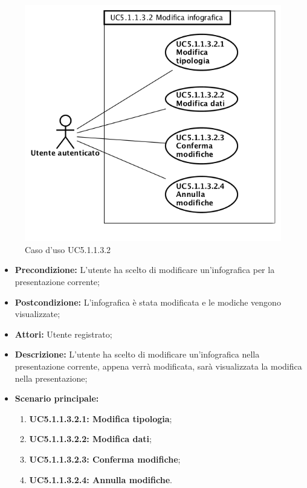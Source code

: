 \begin{figure}[h]
	\begin{center}
	\includegraphics[scale=0.4]{diagram/UC5-1-1-3-2.png}
	\caption{Caso d'uso UC5.1.1.3.2}
	\end{center}
\end{figure}
\begin{itemize}
	\item \textbf{Precondizione:} L'utente ha scelto di modificare un'infografica per la presentazione corrente;
	\item \textbf{Postcondizione:} L'infografica è stata modificata e le modiche vengono visualizzate;
	\item \textbf{Attori:} Utente registrato;
	\item \textbf{Descrizione:} L'utente ha scelto di modificare un'infografica nella presentazione corrente, appena verrà modificata, sarà visualizzata la modifica nella presentazione;
	\item \textbf{Scenario principale:}
	\begin{enumerate}
		\item \textbf{ UC5.1.1.3.2.1: Modifica tipologia};
		\item \textbf{ UC5.1.1.3.2.2: Modifica dati};
		\item \textbf{ UC5.1.1.3.2.3: Conferma modifiche};
		\item \textbf{ UC5.1.1.3.2.4: Annulla modifiche}.
	\end{enumerate}
\end{itemize}

